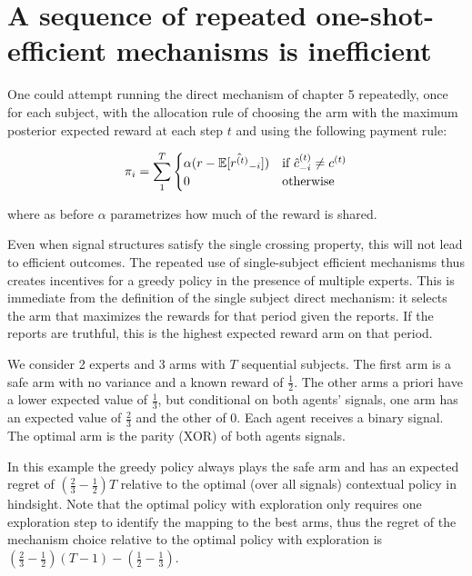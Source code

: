 \section{A sequence of repeated one-shot-efficient mechanisms is inefficient}

One could attempt running the direct mechanism of chapter 5 repeatedly, once for each subject, with the allocation rule of choosing the arm with the maximum posterior expected reward at each step $t$ and using the following payment rule:

\[
    \pi_i = \sum_1^T 
\begin{cases}
   \alpha (r - \operatorname*{\mathbb E}[\hat{r^{(t)}}_{-i}]) & \text{if } \hat{c}^{(t)}_{-i} \neq c^{(t)}\\
    0              & \text{otherwise}
\end{cases}
\]

where as before $\alpha$ parametrizes how much of the reward is shared. 

Even when signal structures satisfy the single crossing property, this will not lead to efficient outcomes.
The repeated use of single-subject efficient mechanisms thus creates incentives for a greedy policy in the presence of multiple experts.
This is immediate from the definition of the single subject direct mechanism: it selects the arm that maximizes the rewards for that period given the reports. If the reports are truthful, this is the highest expected reward arm on that period.


\begin{eg}\label{eg:2regimes}
   We consider 2 experts and 3 arms with $T$ sequential subjects. The first arm is a safe arm with no variance and a known reward of $\frac{1}{2}$. The other arms a priori have a lower expected value of $\frac{1}{3}$, but conditional on both agents' signals, one arm has an expected value of $\frac{2}{3}$ and the other of $0$. 
Each agent receives a binary signal. The optimal arm is the parity (XOR) of both agents signals. 
\end{eg}

In this example the greedy policy always plays the safe arm and has an expected regret of $\left(\frac{2}{3} - \frac{1}{2}\right)T$ relative to the optimal (over all signals) contextual policy in hindsight.
Note that the optimal policy with exploration only requires one exploration step to identify the mapping to the best arms, thus the regret of the mechanism choice  relative to the optimal policy with exploration is $\left(\frac{2}{3} - \frac{1}{2}\right)(T-1) - \left(\frac{1}{2} - \frac{1}{3}\right)$.

